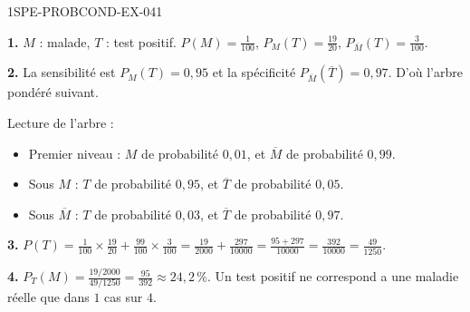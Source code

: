 \begin{corrige}{1SPE-PROBCOND-EX-041}

\textbf{1.} $M$ : malade, $T$ : test positif. $P(M)=\frac{1}{100}$, $P_M(T)=\frac{19}{20}$, $P_{\overline{M}}(T)=\frac{3}{100}$.

\textbf{2.} La sensibilité est $P_M(T) = 0{,}95$ et la spécificité $P_{\overline{M}}(\overline{T}) = 0{,}97$. D'où l'arbre pondéré suivant.

\begin{nxarbreproba}
\end{nxarbreproba}

Lecture de l'arbre :

\begin{itemize}
  \item Premier niveau : $M$ de probabilité $0{,}01$, et $\overline{M}$ de probabilité $0{,}99$.
  \item Sous $M$ : $T$ de probabilité $0{,}95$, et $\overline{T}$ de probabilité $0{,}05$.
  \item Sous $\overline{M}$ : $T$ de probabilité $0{,}03$, et $\overline{T}$ de probabilité $0{,}97$.
\end{itemize}

\medskip

\textbf{3.} $P(T) = \frac{1}{100}\times\frac{19}{20}+\frac{99}{100}\times\frac{3}{100} = \frac{19}{2000}+\frac{297}{10000} = \frac{95+297}{10000} = \frac{392}{10000} = \frac{49}{1250}$.

\textbf{4.} $P_T(M) = \frac{19/2000}{49/1250} = \frac{95}{392} \approx 24{,}2\,\%$. Un test positif ne correspond a une maladie réelle que dans $1$ cas sur $4$.

\end{corrige}
